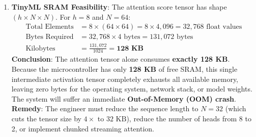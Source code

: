 \begin{enumerate}
    \item \textbf{TinyML SRAM Feasibility}:
    The attention score tensor has shape $(h \times N \times N)$.
    For $h = 8$ and $N = 64$:
    \begin{align*}
    \text{Total Elements} &= 8 \times (64 \times 64) = 8 \times 4{,}096 = 32{,}768 \text{ float values} \\
    \text{Bytes Required} &= 32{,}768 \times 4 \text{ bytes} = 131{,}072 \text{ bytes} \\
    \text{Kilobytes} &= \frac{131{,}072}{1024} = \mathbf{128 \text{ KB}}
    \end{align*}
    \textbf{Conclusion}: The attention tensor alone consumes \textbf{exactly 128 KB}. Because the microcontroller has only \textbf{128 KB} of free SRAM, this single intermediate activation tensor completely exhausts all available memory, leaving zero bytes for the operating system, network stack, or model weights. The system will suffer an immediate \textbf{Out-of-Memory (OOM) crash}.
    \textbf{Remedy}: The engineer must reduce the sequence length to $N=32$ (which cuts the tensor size by $4\times$ to $32\text{ KB}$), reduce the number of heads from 8 to 2, or implement chunked streaming attention.
\end{enumerate}
